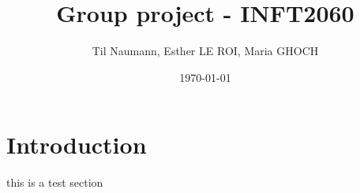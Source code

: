 \documentclass[12pt]{article}
\title{Group project - INFT2060}
\author{Til Naumann, Esther LE ROI, Maria GHOCH}
\date{\today}
\begin{document}
\maketitle
\newpage

\tableofcontents
\newpage

\section{Introduction}
this is a test section 
\end{document}
